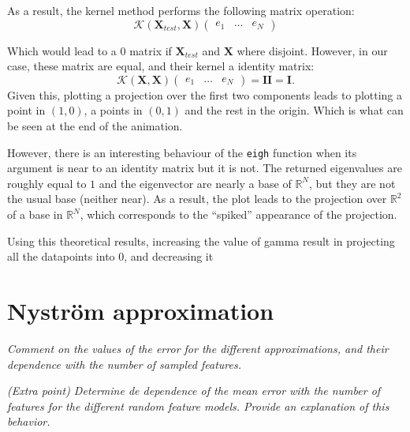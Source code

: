 \documentclass[11pt]{article}
\begin{document}
As a result, the kernel method performs the following matrix operation:
\[
      \mathcal{K}(\bm{X}_{test}, \bm{X})\begin{pmatrix} e_1 & \dots & e_N \end{pmatrix} 
\]

Which would lead to a \( 0 \) matrix if \( \bm{X}_{test} \) and \( \bm{X} \) where disjoint. However, in our case, these matrix are equal, and their kernel a identity matrix:
\[
      \mathcal{K}(\bm{X}, \bm{X})\begin{pmatrix} e_1 & \dots & e_N \end{pmatrix} = \bm{I}\bm{I} =  \bm{I}.
\]
Given this, plotting a projection over the first two components leads to plotting a point in \( (1,0) \), a points in \( (0,1) \) and the rest in the origin. Which is what can be seen at the end of the animation.

However, there is an interesting behaviour of the \texttt{eigh} function when its argument is near to an identity matrix but it is not. The returned eigenvalues are roughly equal to \( 1 \) and the eigenvector are nearly a base of \( \mathbb{R}^N \), but they are not the usual base (neither near). As a result, the plot leads to the projection over \( \mathbb{R}^2\) of a base in \( \mathbb{R}^N \), which corresponds to the ``spiked''  appearance of the projection.




Using this theoretical results, increasing the value of gamma result in projecting all the datapoints into \( 0 \), and decreasing it

\section*{Nyström approximation}

\emph{Comment on the values of the error for the different approximations, and their dependence with the number of sampled features.}

\emph{(Extra point) Determine de dependence of the mean error with the number of features for the different random feature models. Provide an explanation of this behavior.}
\end{document}
